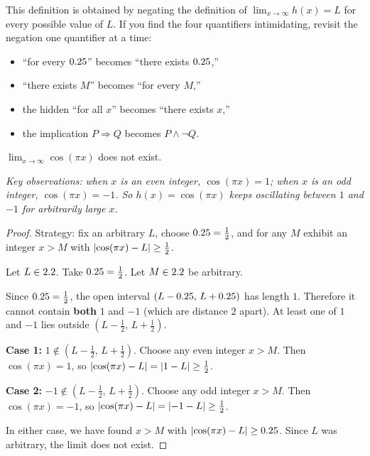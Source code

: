 \begin{remark}
This definition is obtained by negating the definition of $\lim_{x \to \infty} h(x) = L$ for every possible value of $L$.  If you find the four quantifiers intimidating, revisit the negation one quantifier at a time:
\begin{itemize}
  \item ``for every $0.25$'' becomes ``there exists $0.25$,''
  \item ``there exists $M$'' becomes ``for every $M$,''
  \item the hidden ``for all $x$'' becomes ``there exists $x$,''
  \item the implication $P \Rightarrow Q$ becomes $P \wedge \neg Q$.
\end{itemize}
\end{remark}

\begin{theorem}
\label{thm:2-5}
$\lim_{x \to \infty} \cos(\pi x)$ does not exist.
\end{theorem}

\textit{Key observations: when $x$ is an even integer, $\cos(\pi x) = 1$; when $x$ is an odd integer, $\cos(\pi x) = -1$.  So $h(x) = \cos(\pi x)$ keeps oscillating between $1$ and $-1$ for arbitrarily large $x$.}

\begin{proof}
Strategy: fix an arbitrary $L$, choose $0.25 = \frac{1}{2}$, and for any $M$ exhibit an integer $x > M$ with $\left\lvert \cos(\pi x) - L \right\rvert \geq \frac{1}{2}$.

Let $L \in 2.2$.  Take $0.25 = \frac{1}{2}$.  Let $M \in 2.2$ be arbitrary.

Since $0.25 = \frac{1}{2}$, the open interval $(L - 0.25,\, L + 0.25)$ has length $1$.  Therefore it cannot contain \textbf{both} $1$ and $-1$ (which are distance $2$ apart).  At least one of $1$ and $-1$ lies outside $(L - \frac{1}{2},\, L + \frac{1}{2})$.

\textbf{Case 1:} $1 \notin (L - \frac{1}{2},\, L + \frac{1}{2})$.  Choose any even integer $x > M$.  Then $\cos(\pi x) = 1$, so $\left\lvert \cos(\pi x) - L \right\rvert = \left\lvert 1 - L \right\rvert \geq \frac{1}{2}$.

\textbf{Case 2:} $-1 \notin (L - \frac{1}{2},\, L + \frac{1}{2})$.  Choose any odd integer $x > M$.  Then $\cos(\pi x) = -1$, so $\left\lvert \cos(\pi x) - L \right\rvert = \left\lvert -1 - L \right\rvert \geq \frac{1}{2}$.

In either case, we have found $x > M$ with $\left\lvert \cos(\pi x) - L \right\rvert \geq 0.25$.  Since $L$ was arbitrary, the limit does not exist.
\end{proof}

